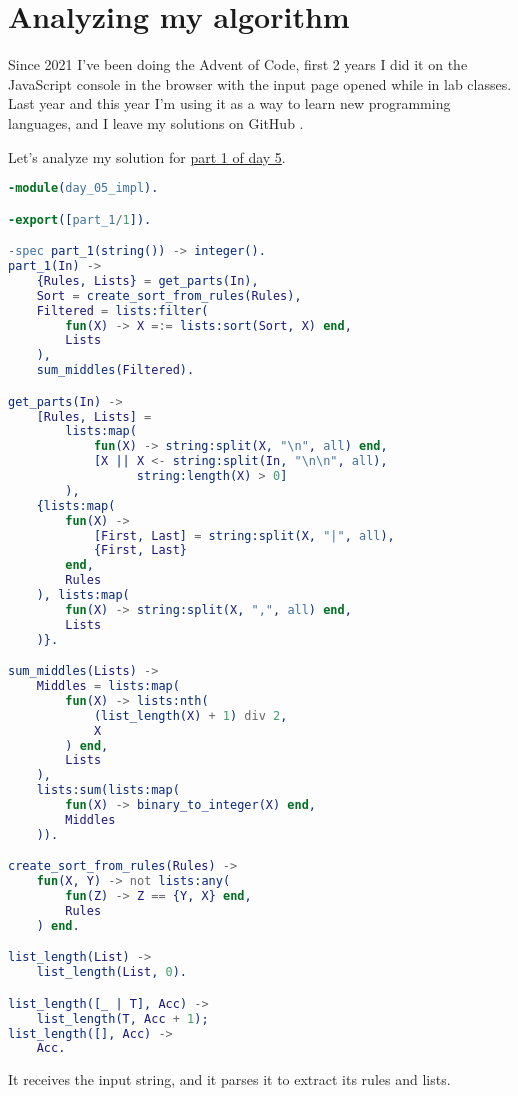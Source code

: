 \documentclass[a4paper,12pt]{article}
\theoremstyle{mytheoremstyle}
\theoremstyle{mytheoremstyle}
\theoremstyle{myproblemstyle}
\begin{document}
    \section{Analyzing my algorithm}

    Since 2021 I've been doing the Advent of Code\cite{aoc}, first 2 years I
    did it on the JavaScript console in the browser with the input page opened
    while in lab classes. Last year and this year I'm using it as a way to
    learn new programming languages, and I leave my solutions on GitHub
    \cite{aocsols}.

    Let's analyze my solution for
    \href{https://adventofcode.com/2024/day/5}{part 1 of day 5}.

    \begin{lstlisting}[language=erlang, caption={solution for day 5, part 1 of the Advent of Code 2024}]
-module(day_05_impl).

-export([part_1/1]).

-spec part_1(string()) -> integer().
part_1(In) ->
    {Rules, Lists} = get_parts(In),
    Sort = create_sort_from_rules(Rules),
    Filtered = lists:filter(
        fun(X) -> X =:= lists:sort(Sort, X) end,
        Lists
    ),
    sum_middles(Filtered).

get_parts(In) ->
    [Rules, Lists] =
        lists:map(
            fun(X) -> string:split(X, "\n", all) end,
            [X || X <- string:split(In, "\n\n", all),
                  string:length(X) > 0]
        ),
    {lists:map(
        fun(X) ->
            [First, Last] = string:split(X, "|", all),
            {First, Last}
        end,
        Rules
    ), lists:map(
        fun(X) -> string:split(X, ",", all) end,
        Lists
    )}.

sum_middles(Lists) ->
    Middles = lists:map(
        fun(X) -> lists:nth(
            (list_length(X) + 1) div 2,
            X
        ) end,
        Lists
    ),
    lists:sum(lists:map(
        fun(X) -> binary_to_integer(X) end,
        Middles
    )).

create_sort_from_rules(Rules) ->
    fun(X, Y) -> not lists:any(
        fun(Z) -> Z == {Y, X} end,
        Rules
    ) end.

list_length(List) ->
    list_length(List, 0).

list_length([_ | T], Acc) ->
    list_length(T, Acc + 1);
list_length([], Acc) ->
    Acc.
    \end{lstlisting}

    It receives the input string, and it parses it to extract its rules and
    lists.
\end{document}

